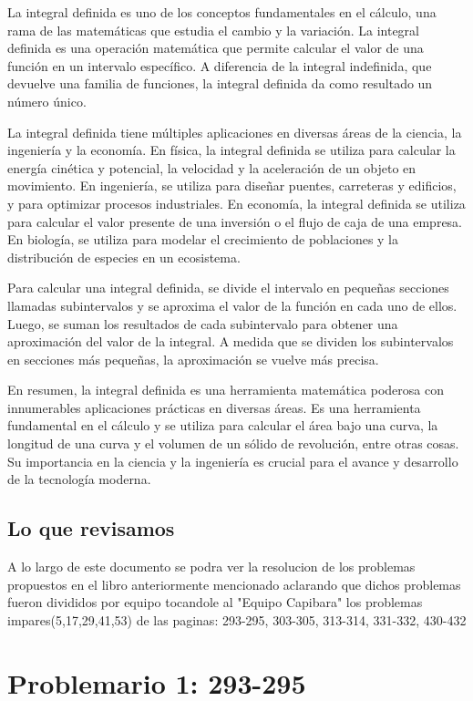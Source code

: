 \documentclass{article}
\begin{document}
  La integral definida es uno de los conceptos fundamentales en el cálculo, una rama de las matemáticas que estudia el cambio y la variación. La integral definida es una operación matemática que permite calcular el valor de una función en un intervalo específico. A diferencia de la integral indefinida, que devuelve una familia de funciones, la integral definida da como resultado un número único.

  La integral definida tiene múltiples aplicaciones en diversas áreas de la ciencia, la ingeniería y la economía. En física, la integral definida se utiliza para calcular la energía cinética y potencial, la velocidad y la aceleración de un objeto en movimiento. En ingeniería, se utiliza para diseñar puentes, carreteras y edificios, y para optimizar procesos industriales. En economía, la integral definida se utiliza para calcular el valor presente de una inversión o el flujo de caja de una empresa. En biología, se utiliza para modelar el crecimiento de poblaciones y la distribución de especies en un ecosistema.
  
  Para calcular una integral definida, se divide el intervalo en pequeñas secciones llamadas subintervalos y se aproxima el valor de la función en cada uno de ellos. Luego, se suman los resultados de cada subintervalo para obtener una aproximación del valor de la integral. A medida que se dividen los subintervalos en secciones más pequeñas, la aproximación se vuelve más precisa.
  
  En resumen, la integral definida es una herramienta matemática poderosa con innumerables aplicaciones prácticas en diversas áreas. Es una herramienta fundamental en el cálculo y se utiliza para calcular el área bajo una curva, la longitud de una curva y el volumen de un sólido de revolución, entre otras cosas. Su importancia en la ciencia y la ingeniería es crucial para el avance y desarrollo de la tecnología moderna.
  \subsection{Lo que revisamos}
    A lo largo de este documento se podra ver la resolucion de los problemas propuestos en el libro anteriormente mencionado aclarando que dichos problemas fueron divididos por equipo tocandole al "Equipo Capibara" los problemas impares(5,17,29,41,53) de las paginas: 293-295, 303-305, 313-314, 331-332, 430-432 
  \section{Problemario 1: 293-295}
  
\end{document}
